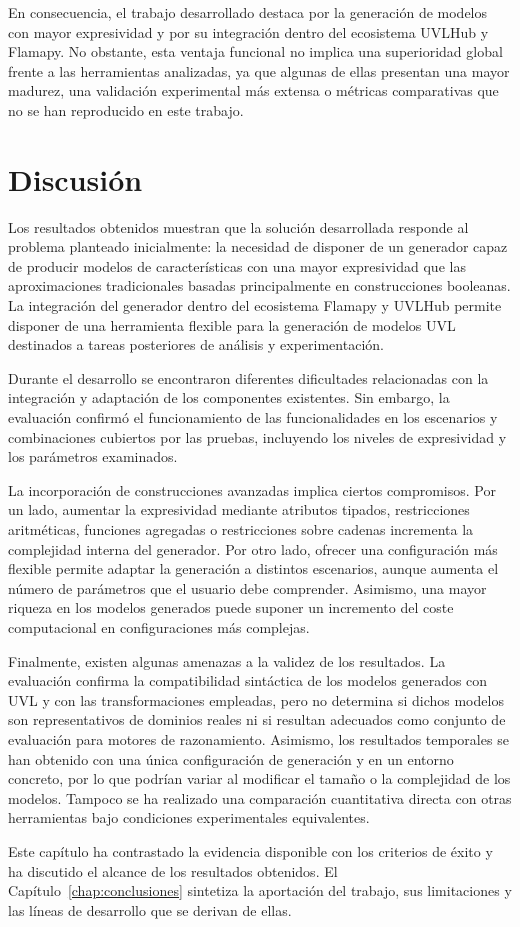 En consecuencia, el trabajo desarrollado destaca por la generación de modelos
con mayor expresividad y por su integración dentro del ecosistema UVLHub y
Flamapy. No obstante, esta ventaja funcional no implica una superioridad global
frente a las herramientas analizadas, ya que algunas de ellas presentan una
mayor madurez, una validación experimental más extensa o métricas comparativas
que no se han reproducido en este trabajo.

\section{Discusión}
\label{sec:discusion}


Los resultados obtenidos muestran que la solución desarrollada responde al
problema planteado inicialmente: la necesidad de disponer de un generador capaz
de producir modelos de características con una mayor expresividad que las
aproximaciones tradicionales basadas principalmente en construcciones
booleanas. La integración del generador dentro del ecosistema Flamapy y UVLHub
permite disponer de una herramienta flexible para la generación de modelos UVL
destinados a tareas posteriores de análisis y experimentación.

Durante el desarrollo se encontraron diferentes dificultades relacionadas con
la integración y adaptación de los componentes existentes. Sin embargo, la evaluación confirmó el funcionamiento de las funcionalidades en los
escenarios y combinaciones cubiertos por las pruebas, incluyendo los niveles
de expresividad y los parámetros examinados.

La incorporación de construcciones avanzadas implica ciertos compromisos. Por
un lado, aumentar la expresividad mediante atributos tipados, restricciones
aritméticas, funciones agregadas o restricciones sobre cadenas incrementa la
complejidad interna del generador. Por otro lado, ofrecer una configuración más
flexible permite adaptar la generación a distintos escenarios, aunque aumenta
el número de parámetros que el usuario debe comprender. Asimismo, una mayor
riqueza en los modelos generados puede suponer un incremento del coste
computacional en configuraciones más complejas.

Finalmente, existen algunas amenazas a la validez de los resultados. La
evaluación confirma la compatibilidad sintáctica de los modelos generados con
UVL y con las transformaciones empleadas, pero no determina si dichos modelos
son representativos de dominios reales ni si resultan adecuados como conjunto de
evaluación para motores de razonamiento. Asimismo, los resultados temporales se
han obtenido con una única configuración de generación y en un entorno concreto,
por lo que podrían variar al modificar el tamaño o la complejidad de los
modelos. Tampoco se ha realizado una comparación cuantitativa directa con otras
herramientas bajo condiciones experimentales equivalentes.


Este capítulo ha contrastado la evidencia disponible con los criterios de
éxito y ha discutido el alcance de los resultados obtenidos. El
Capítulo~\ref{chap:conclusiones} sintetiza la aportación del trabajo, sus
limitaciones y las líneas de desarrollo que se derivan de ellas.
